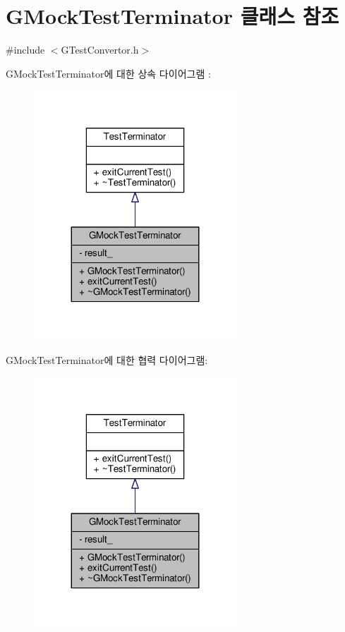 \hypertarget{class_g_mock_test_terminator}{}\section{G\+Mock\+Test\+Terminator 클래스 참조}
\label{class_g_mock_test_terminator}


{\ttfamily \#include $<$G\+Test\+Convertor.\+h$>$}



G\+Mock\+Test\+Terminator에 대한 상속 다이어그램 \+: 
\nopagebreak
\begin{figure}[H]
\begin{center}
\leavevmode
\includegraphics[width=215pt]{class_g_mock_test_terminator__inherit__graph}
\end{center}
\end{figure}


G\+Mock\+Test\+Terminator에 대한 협력 다이어그램\+:
\nopagebreak
\begin{figure}[H]
\begin{center}
\leavevmode
\includegraphics[width=215pt]{class_g_mock_test_terminator__coll__graph}
\end{center}
\end{figure}
